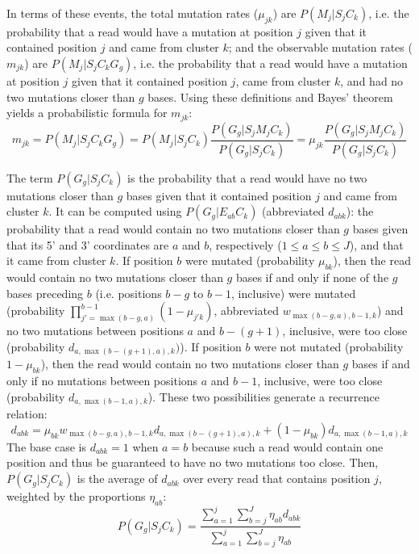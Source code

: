 \documentclass[11pt]{article}
\begin{document}
In terms of these events, the total mutation rates ($\mu_{jk}$) are $P(M_j | S_j C_k)$, i.e. the probability that a read would have a mutation at position $j$ given that it contained position $j$ and came from cluster $k$; and the observable mutation rates ($m_{jk}$) are $P(M_j | S_j C_k G_g)$, i.e. the probability that a read would have a mutation at position $j$ given that it contained position $j$, came from cluster $k$, and had no two mutations closer than $g$ bases.
Using these definitions and Bayes' theorem yields a probabilistic formula for $m_{jk}$:
$$m_{jk} = P(M_j | S_j C_k G_g) = P(M_j | S_j C_k) \frac{P(G_g | S_j M_j C_k)}{P(G_g | S_j C_k)} = \mu_{jk} \frac{P(G_g | S_j M_j C_k)}{P(G_g | S_j C_k)}$$

The term $P(G_g | S_j C_k)$ is the probability that a read would have no two mutations closer than $g$ bases given that it contained position $j$ and came from cluster $k$.
It can be computed using $P(G_g | E_{ab} C_k)$ (abbreviated $d_{abk}$): the probability that a read would contain no two mutations closer than $g$ bases given that its 5' and 3' coordinates are $a$ and $b$, respectively ($1 \le a \le b \le J$), and that it came from cluster $k$.
If position $b$ were mutated (probability $\mu_{bk}$), then the read would contain no two mutations closer than $g$ bases if and only if none of the $g$ bases preceding $b$ (i.e. positions $b - g$ to $b - 1$, inclusive) were mutated (probability $\prod_{j'=\max(b-g, a)}^{b-1}(1 - \mu_{j'k})$, abbreviated $w_{\max(b-g, a),b-1,k}$) and no two mutations between positions $a$ and $b - (g + 1)$, inclusive, were too close (probability $d_{a,\max(b-(g+1), a),k})$).
If position $b$ were not mutated (probability $1 - \mu_{bk}$), then the read would contain no two mutations closer than $g$ bases if and only if no mutations between positions $a$ and $b - 1$, inclusive, were too close (probability $d_{a,\max(b-1,a),k}$).
These two possibilities generate a recurrence relation:
$$d_{abk} = \mu_{bk} w_{\max(b-g, a),b-1,k} d_{a,\max(b-(g+1), a),k} + (1 - \mu_{bk}) d_{a,\max(b-1,a),k}$$
The base case is $d_{abk} = 1$ when $a = b$ because such a read would contain one position and thus be guaranteed to have no two mutations too close.
Then, $P(G_g | S_j C_k)$ is the average of $d_{abk}$ over every read that contains position $j$, weighted by the proportions $\eta_{ab}$:
$$P(G_g | S_j C_k) = \frac{\sum_{a=1}^{j}\sum_{b=j}^{J}\eta_{ab}d_{abk}}{\sum_{a=1}^{j}\sum_{b=j}^{J}\eta_{ab}}$$
\end{document}
